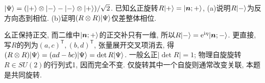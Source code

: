 \begin{exercise}
$\lvert \Psi\rangle=(\lvert +\rangle\otimes\lvert -\rangle-\lvert -\rangle\otimes\lvert +\rangle)/\sqrt2$. 已知幺正旋转$R\lvert +\rangle=\lvert \boldsymbol n;+\rangle$, (a)说明$R\lvert -\rangle$为反方向态到相位. (b)证明$(R\otimes R)\lvert \Psi\rangle$仅差整体相位.
\end{exercise}
\begin{solution}
幺正保持正交, 而二维中$\lvert \boldsymbol n;+\rangle$的正交补只有一维, 所以$R\lvert -\rangle=\mathrm e^{\mathrm i\eta}\lvert \boldsymbol n;-\rangle$. 更直接, 写$R$的列为$(a,c)^{\mathsf T},(b,d)^{\mathsf T}$, 张量展开交叉项消去, 得$(R\otimes R)\lvert \Psi\rangle=(ad-bc)\lvert \Psi\rangle=\det R\lvert \Psi\rangle$. 一般幺正$|\det R|=1$; 物理自旋旋转$R\in SU(2)$的行列式1, 因而完全不变. 仅旋转其中一个自旋则通常改变关联, 本题是共同旋转.
\end{solution}
